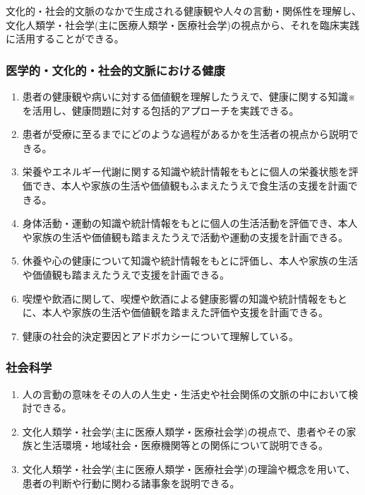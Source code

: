 文化的・社会的文脈のなかで生成される健康観や人々の言動・関係性を理解し、文化人類学・社会学(主に医療人類学・医療社会学)の視点から、それを臨床実践に活用することができる。

\hypertarget{ux533bux5b66ux7684ux6587ux5316ux7684ux793eux4f1aux7684ux6587ux8108ux306bux304aux3051ux308bux5065ux5eb7}{%
\subsubsection{医学的・文化的・社会的文脈における健康}\label{ux533bux5b66ux7684ux6587ux5316ux7684ux793eux4f1aux7684ux6587ux8108ux306bux304aux3051ux308bux5065ux5eb7}}

\begin{enumerate}
\def\labelenumi{\arabic{enumi}.}
\tightlist
\item
  患者の健康観や病いに対する価値観を理解したうえで、健康に関する知識※を活用し、健康問題に対する包括的アプローチを実践できる。
\item
  患者が受療に至るまでにどのような過程があるかを生活者の視点から説明できる。
\item
  栄養やエネルギー代謝に関する知識や統計情報をもとに個人の栄養状態を評価でき、本人や家族の生活や価値観もふまえたうえで食生活の支援を計画できる。
\item
  身体活動・運動の知識や統計情報をもとに個人の生活活動を評価でき、本人や家族の生活や価値観も踏まえたうえで活動や運動の支援を計画できる。
\item
  休養や心の健康について知識や統計情報をもとに評価し、本人や家族の生活や価値観も踏まえたうえで支援を計画できる。
\item
  喫煙や飲酒に関して、喫煙や飲酒による健康影響の知識や統計情報をもとに、本人や家族の生活や価値観を踏まえた評価や支援を計画できる。
\item
  健康の社会的決定要因とアドボカシーについて理解している。
\end{enumerate}

\hypertarget{ux793eux4f1aux79d1ux5b66}{%
\subsubsection{社会科学}\label{ux793eux4f1aux79d1ux5b66}}

\begin{enumerate}
\def\labelenumi{\arabic{enumi}.}
\tightlist
\item
  人の言動の意味をその人の人生史・生活史や社会関係の文脈の中において検討できる。
\item
  文化人類学・社会学(主に医療人類学・医療社会学)の視点で、患者やその家族と生活環境・地域社会・医療機関等との関係について説明できる。
\item
  文化人類学・社会学(主に医療人類学・医療社会学)の理論や概念を用いて、患者の判断や行動に関わる諸事象を説明できる。
\end{enumerate}


